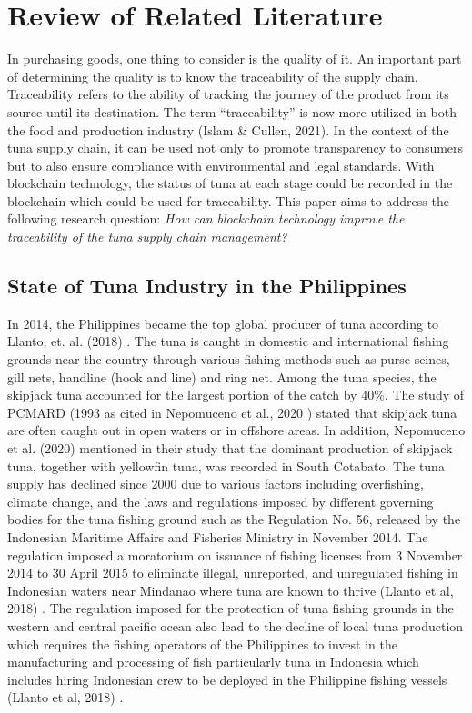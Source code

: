 \chapter{Review of Related Literature}
\label{sec:relatedlit}
In purchasing goods, one thing to consider is the quality of it. An important part of determining the quality is to know the traceability of the supply chain. Traceability refers to the ability of tracking the journey of the product from its source until its destination. The term “traceability” is now more utilized in both the food and production industry (Islam \& Cullen, 2021).  In the context of the tuna supply chain, it can be used not only to promote transparency to consumers but to also ensure compliance with environmental and legal standards. With blockchain technology, the status of tuna at each stage could be recorded in the blockchain which could be used for traceability. This paper aims to address the following research question: \textit{How can blockchain technology improve the traceability of the tuna supply chain management?}


\section{State of Tuna Industry in the Philippines}
In 2014, the Philippines became the top global producer of tuna according to Llanto, et. al. (2018) \nocite{rrl-SoTIP1}. The tuna is caught in domestic and international fishing grounds near the country through various fishing methods such as purse seines, gill nets, handline (hook and line) and ring net. Among the tuna species, the skipjack tuna accounted for the largest portion of the catch by 40\%. The study of PCMARD (1993 as cited in Nepomuceno et al., 2020 ) \nocite{rrl-SoTIP2} stated that skipjack tuna are often caught out in open waters or in offshore areas. In addition, Nepomuceno et al. (2020) \nocite{rrl-SoTIP2} mentioned in their study that the dominant production of skipjack tuna, together with yellowfin tuna, was recorded in South Cotabato.
The tuna supply has declined since 2000 due to various factors including overfishing, climate change, and the laws and regulations imposed by different governing bodies for the tuna fishing ground such as the Regulation No. 56, released by the Indonesian Maritime Affairs and Fisheries Ministry in November 2014. The regulation imposed a moratorium on issuance of fishing licenses from 3 November 2014 to 30 April 2015 to eliminate illegal, unreported, and unregulated fishing in Indonesian waters near Mindanao where tuna are known to thrive (Llanto et al, 2018) \nocite{rrl-SoTIP1}. The regulation imposed for the protection of tuna fishing grounds in the western and central pacific ocean also lead to the decline of local tuna production which requires the  fishing operators of the Philippines to invest in the manufacturing and processing of fish particularly tuna in Indonesia which includes hiring Indonesian crew to be deployed in the Philippine fishing vessels (Llanto et al, 2018) \nocite{rrl-SoTIP1}.

